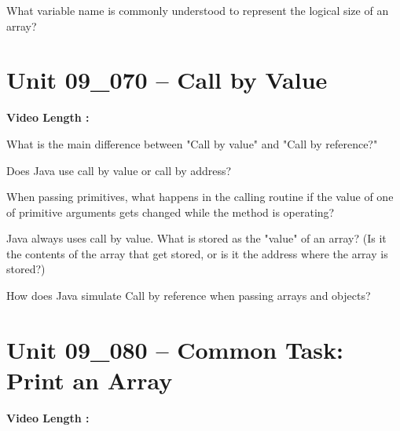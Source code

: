 \documentclass[letterpaper,12pt]{exam}
\newcommand{\unit}{Unit 09}
\begin{document}
\begin{questions}
\begin{samepage}
    \question What variable name is commonly understood to represent the logical size of an array?
    \vspace{5mm}
\end{samepage}

\section*{\unit\_070 -- Call by Value } 
\par{\selectfont\textbf{Video Length :}}

\begin{samepage}
    \question What is the main difference between "Call by value" and "Call by reference?"
    \vspace{5mm}
\end{samepage}

\begin{samepage}
    \question Does Java use call by value or call by address?
    \vspace{5mm}
\end{samepage}

\begin{samepage}
    \question When passing primitives, what happens in the calling routine if the value of one of primitive arguments gets changed while the method is operating?
    \vspace{5mm}
\end{samepage}

\begin{samepage}
    \question Java always uses call by value.  What is stored as the "value" of an array?  (Is it the contents of the array that get stored, or is it the address where the array is stored?)
    \vspace{5mm}
\end{samepage}

\begin{samepage}
    \question How does Java simulate Call by reference when passing arrays and objects?
    \vspace{5mm}
\end{samepage}

\section*{\unit\_080 -- Common Task: Print an Array} 
\par{\selectfont\textbf{Video Length :}}


\end{questions}
\end{document}
